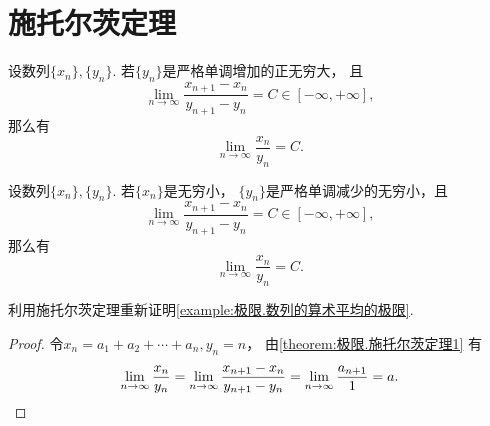 \section{施托尔茨定理}
\begin{theorem}[施托尔茨定理I]\label{theorem:极限.施托尔茨定理1}
设数列\(\{x_n\},\{y_n\}\).
若\(\{y_n\}\)是严格单调增加的正无穷大，
且\[
	\lim_{n\to\infty} \frac{x_{n+1}-x_n}{y_{n+1}-y_n}
	= C
	\in[-\infty,+\infty],
\]
那么有\[
	\lim_{n\to\infty} \frac{x_n}{y_n}
	= C.
\]
\end{theorem}

\begin{theorem}[施托尔茨定理II]\label{theorem:极限.施托尔茨定理2}
设数列\(\{x_n\},\{y_n\}\).
若\(\{x_n\}\)是无穷小，
\(\{y_n\}\)是严格单调减少的无穷小，且\[
	\lim_{n\to\infty} \frac{x_{n+1}-x_n}{y_{n+1}-y_n}
	= C
	\in[-\infty,+\infty],
\]
那么有\[
	\lim_{n\to\infty} \frac{x_n}{y_n}
	= C.
\]
\end{theorem}


\begin{example}
利用施托尔茨定理重新证明\cref{example:极限.数列的算术平均的极限}.
\begin{proof}
令\(x_n=a_1+a_2+\dotsb+a_n,y_n=n\)，
由\cref{theorem:极限.施托尔茨定理1} 有\[
	\lim_{n\to\infty} \frac{x_n}{y_n}
	= \lim_{n\to\infty} \frac{x_{n+1}-x_n}{y_{n+1}-y_n}
	= \lim_{n\to\infty} \frac{a_{n+1}}{1}
	= a.
	\qedhere
\]
\end{proof}
\end{example}

